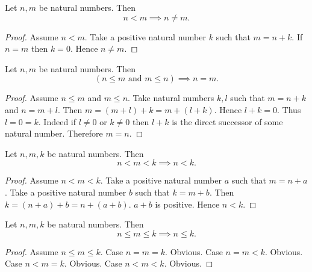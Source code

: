 \documentclass[../arithmetic.tex]{subfiles}
\begin{document}
  \begin{forthel}
    \begin{proposition}
      Let $n, m$ be natural numbers.
      Then \[ n \less m \implies n \neq m. \]
    \end{proposition}
    \begin{proof}
      Assume $n \less m$.
      Take a positive natural number $k$ such that $m = n \plus k$.
      If $n = m$ then $k = 0$.
      Hence $n \neq m$.
    \end{proof}
  \end{forthel}

  \begin{forthel}
    \begin{proposition}
      Let $n, m$ be natural numbers.
      Then \[ (\text{$n \leq m$ and $m \leq n$}) \implies n = m. \]
    \end{proposition}
    \begin{proof}
      Assume $n \leq m$ and $m \leq n$.
      Take natural numbers $k, l$ such that $m = n \plus k$ and $n = m \plus l$.
      Then $m
        = (m \plus l) \plus k
        = m \plus (l \plus k)$.
      Hence $l \plus k = 0$.
      Thus $l = 0 = k$.
      Indeed if $l \neq 0$ or $k \neq 0$ then $l \plus k$ is the direct successor of
      some natural number.
      Therefore $m = n$.
    \end{proof}
  \end{forthel}

  \begin{forthel}
    \begin{proposition}
      Let $n, m, k$ be natural numbers.
      Then \[ n \less m \less k \implies n \less k. \]
    \end{proposition}
    \begin{proof}
      Assume $n \less m \less k$.
      Take a positive natural number $a$ such that $m = n \plus a$.
      Take a positive natural number $b$ such that $k = m \plus b$.
      Then $k
        = (n \plus a) \plus b
        = n \plus (a \plus b)$.
      $a \plus b$ is positive.
      Hence $n \less k$.
    \end{proof}
  \end{forthel}

  \begin{forthel}
    \begin{proposition}
      Let $n, m, k$ be natural numbers.
      Then \[ n \leq m \leq k \implies n \leq k. \]
    \end{proposition}
    \begin{proof}
      Assume $n \leq m \leq k$.
      Case $n = m = k$. Obvious.
      Case $n = m \less k$. Obvious.
      Case $n \less m = k$. Obvious.
      Case $n \less m \less k$. Obvious.
    \end{proof}
  \end{forthel}
\end{document}

